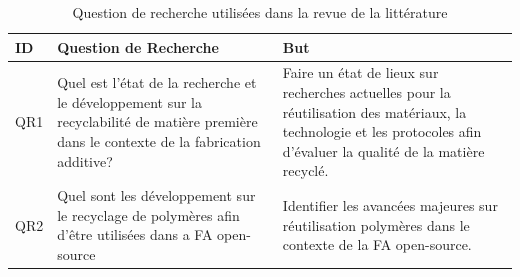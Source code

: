 \begin{table}[!htb]
	\centering
	\begin{adjustbox}{max width=\textwidth}
		\begin{tabular}{l|p{8cm}|p{8cm}}
			\toprule 
			\textbf{ID} &\textbf{Question de Recherche} & \textbf{But}\\
			\midrule
			
			QR1 & 
			Quel est l'état de la recherche et le développement sur la recyclabilité de matière première dans le contexte de la fabrication additive? 	&
			Faire un état de lieux sur recherches actuelles pour la réutilisation des matériaux, la technologie et les protocoles afin d'évaluer la qualité de la matière recyclé. \\
			
			
			QR2 & 
			Quel sont les développement sur le recyclage de polymères afin d'être utilisées dans a FA open-source
			& 
			Identifier les avancées majeures sur  réutilisation polymères dans le contexte de la FA open-source.\\
			
			
			
			
			\bottomrule
			
		\end{tabular} 
	\end{adjustbox}
	
	\caption[]{Question de recherche utilisées dans la revue de la littérature}
	\label{Chap-1:Table.Research.questions}
\end{table}


